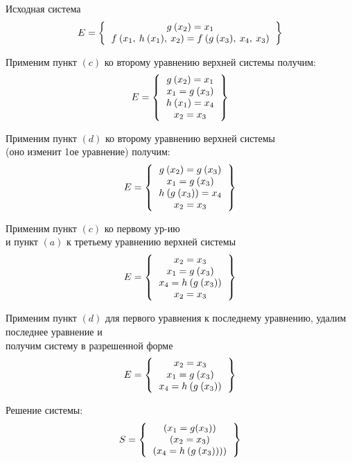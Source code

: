     \begin{example}\end{example}
			Исходная система
		\[
		E=
			\left \{
			\begin{tabular}{c}
				$g\:(x_2)=x_1$\\
				$f\:(x_1,\: h\: (x_1),\: x_2)=f\:(g\:(x_3),\: x_4,\: x_3)$
			\end{tabular}
			\right \}
		\]

			Применим пункт $(c)$ ко второму уравнению верхней системы получим:
			\[
		E=
			\left \{
			\begin{tabular}{c}
				$g\:(x_2)=x_1$\\
				$x_1=g\:(x_3)$\\
				$h\:(x_1)=x_4$\\
				$x_2=x_3$
			\end{tabular}
			\right \}
		\]

			Применим пункт $(d)$ ко второму уравнению верхней системы\\
				(оно изменит 1ое уравнение) получим:
			\[
			E=
			\left \{
			\begin{tabular}{c}
				$g\:(x_2)=g\:(x_3)$\\
				$x_1=g\:(x_3)$\\
				$h\:(g\:(x_3))=x_4$\\
				$x_2=x_3$

			\end{tabular}
			\right \}
		\]

			Применим пункт $(c)$ ко первому ур-ию\\
				и пункт $(a)$ к третьему уравнению верхней системы
			\[
			E=
			\left \{
			\begin{tabular}{c}
				$x_2=x_3$\\
				$x_1=g\:(x_3)$\\
				$x_4=h\:(g\:(x_3))$\\
				$x_2=x_3$
			\end{tabular}
			\right \}
		\]

			Применим пункт $(d)$ для первого уравнения к последнему уравнению, удалим последнее уравнение и \\
			получим систему в разрешенной форме
\[
			E=
			\left \{
			\begin{tabular}{c}
				$x_2=x_3$\\
				$x_1=g\:(x_3)$\\
				$x_4=h\:(g\:(x_3))$
			\end{tabular}
			\right \}
		\]

			Решение системы:
		\[		S=
			\left \{
			\begin{tabular}{c}
				$(x_1=g(x_3))$\\
				$(x_2=x_3)$\\
				$(x_4=h\:(g\:(x_3))))$\\
			\end{tabular}
			\right \}
		\]				
			
